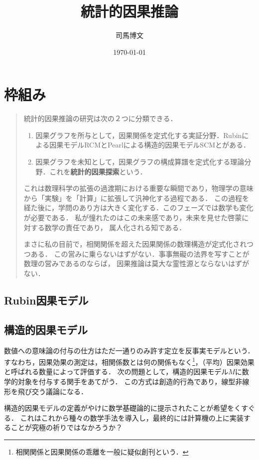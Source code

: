 \documentclass[uplatex,dvipdfmx]{jsreport}
\title{統計的因果推論}
\author{司馬博文}
\date{\today}
\begin{document}
\tableofcontents

\chapter{枠組み}

\begin{quotation}
    統計的因果推論の研究は次の２つに分類できる．
    \begin{enumerate}
        \item 因果グラフを所与として，因果関係を定式化する実証分野．Rubinによる因果モデルRCMとPearlによる構造的因果モデルSCMとがある．
        \item 因果グラフを未知として，因果グラフの構成算譜を定式化する理論分野．これを\textbf{統計的因果探索}という．
    \end{enumerate}
    これは数理科学の拡張の過渡期における重要な瞬間であり，物理学の意味から「実験」を「計算」に拡張して汎神化する過程である．
    この過程を経た後に，学問のあり方は大きく変化する．このフェーズでは数学も変化が必要である．
    私が憧れたのはこの未来感であり，未来を見せた啓蒙に対する数学の責任であり，
    属人化される知である．

    まさに私の目前で，相関関係を超えた因果関係の数理構造が定式化されつつある．
    この営みに乗らないはずがない．事事無礙の法界を写すことが数理の営みであるのならば，
    因果推論は莫大な霊性源とならないはずがない．
\end{quotation}

\section{Rubin因果モデル}

\section{構造的因果モデル}

\begin{tcolorbox}[colframe=ForestGreen, colback=ForestGreen!10!white,breakable,colbacktitle=ForestGreen!40!white,coltitle=black,fonttitle=\bfseries\sffamily,
title=]
    数値への意味論の付与の仕方はただ一通りのみ許す定立を反事実モデルという．
    すなわち，因果効果の測定は，相関係数とは何の関係もなく\footnote{相関関係と因果関係の乖離を一般に疑似創刊という．}，（平均）因果効果と呼ばれる数量によって評価する．
    次の問題として，構造的因果モデル$M$に数学的対象を付与する関手をあてがう．
    この方式は創造的行為であり，線型非線形を飛び交う議論になる．

    構造的因果モデルの定義がやけに数学基礎論的に提示されたことが希望をくすぐる．
    これはこれから種々の数学手法を導入し，最終的には計算機の上に実装することが究極の祈りではなかろうか？
\end{tcolorbox}
\end{document}
